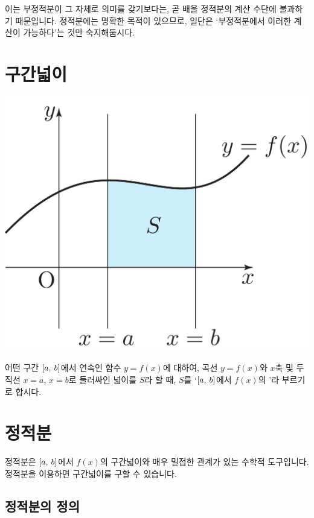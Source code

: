 이는 부정적분이 그 자체로 의미를 갖기보다는, 곧 배울 정적분의 계산 수단에 불과하기 때문입니다. 정적분에는 명확한 목적이 있으므로, 일단은 `부정적분에서 이러한 계산이 가능하다'는 것만 숙지해둡시다.
\clearpage 

\section{구간넓이}
\begin{center}
\includegraphics[scale=.125]{pic0/pic168.pdf}
  \end{center}  
  어떤 구간 $\left[a,\: b\right]$에서 연속인 함수 $y=f(x)$에 대하여, 곡선 $y=f\left( x \right) $와 $x$축 및 두 직선 $x=a$, $x=b$로 둘러싸인 넓이를 $S$라 할 때, $S$를 `$\left[a,\: b\right]$에서 $f\left( x \right) $의 '라 부르기로 합시다.

\section{정적분}
정적분은 $\left[a,\: b\right]$에서 $f\left( x \right) $의 구간넓이와 매우 밀접한 관계가 있는 수학적 도구입니다. 정적분을 이용하면 구간넓이를 구할 수 있습니다.

\subsection{정적분의 정의}

